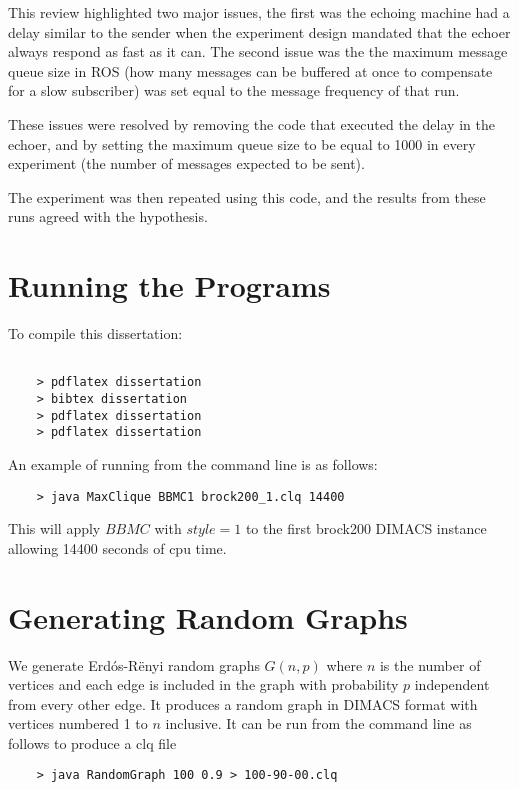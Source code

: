 \documentclass{l4proj}
\begin{document}
This review highlighted two major issues, the first was the echoing machine had a delay similar to the sender when the experiment design mandated that the echoer always respond as fast as it can. The second issue was the the maximum message queue size in ROS (how many messages can be buffered at once to compensate for a slow subscriber) was set equal to the message frequency of that run. 

These issues were resolved by removing the code that executed the delay in the echoer, and by setting the maximum queue size to be equal to 1000 in every experiment (the number of messages expected to be sent).

The experiment was then repeated using this code, and the results from these runs agreed with the hypothesis.


\chapter{Running the Programs}

To compile this dissertation:
\begin{verbatim}

	> pdflatex dissertation
	> bibtex dissertation
	> pdflatex dissertation
    > pdflatex dissertation

\end{verbatim}


An example of running from the command line is as follows:
\begin{verbatim}
	> java MaxClique BBMC1 brock200_1.clq 14400
\end{verbatim}
This will apply $BBMC$ with $style = 1$ to the first brock200 DIMACS instance allowing 14400 seconds of cpu time.

\chapter{Generating Random Graphs}
\label{sec:randomGraph}
We generate Erd\'{o}s-R\"{e}nyi random graphs $G(n,p)$ where $n$ is the number of vertices and
each edge is included in the graph with probability $p$ independent from every other edge. It produces
a random graph in DIMACS format with vertices numbered 1 to $n$ inclusive. It can be run from the command line as follows to produce 
a clq file
\begin{verbatim}
	> java RandomGraph 100 0.9 > 100-90-00.clq
\end{verbatim}




\end{document}
